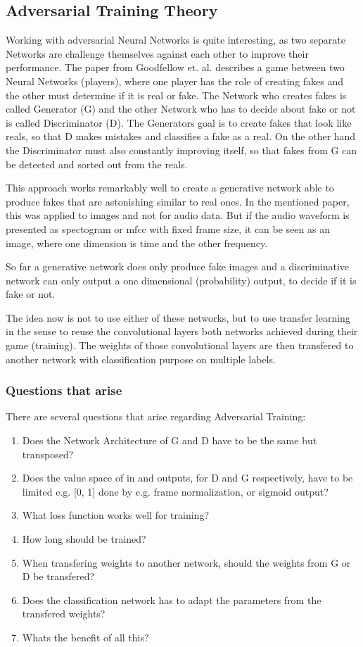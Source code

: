 \subsection{Adversarial Training Theory}\label{sec:adv_theory}
Working with adversarial Neural Networks is quite interesting, as two separate Networks are challenge themselves against each other to improve their performance.
The paper from Goodfellow et. al. \cite{goodfellow2014} describes a game between two Neural Networks (players), where one player has the role of creating fakes and the other must determine if it is real or fake.
The Network who creates fakes is called Generator (G) and the other Network who has to decide about fake or not is called Discriminator (D).
The Generators goal is to create fakes that look like reals, so that D makes mistakes and classifies a fake as a real.
On the other hand the Discriminator must also constantly improving itself, so that fakes from G can be detected and sorted out from the reals.

This approach works remarkably well to create a generative network able to produce fakes that are astonishing similar to real ones.
In the mentioned paper, this was applied to images and not for audio data.
But if the audio waveform is presented as spectogram or mfcc with fixed frame size, it can be seen as an image, where one dimension is time and the other frequency.

So far a generative network does only produce fake images and a discriminative network can only output a one dimensional (probability) output, to decide if it is fake or not.

The idea now is not to use either of these networks, but to use transfer learning in the sense to reuse the convolutional layers both networks achieved during their game (training).
The weights of those convolutional layers are then transfered to another network with classification purpose on multiple labels.

\subsubsection{Questions that arise}
There are several questions that arise regarding Adversarial Training:
\begin{enumerate}[label={Q.\textgoth{A}.\arabic*)}, leftmargin=1.4cm]
  \item Does the Network Architecture of G and D have to be the same but transposed?
  \item Does the value space of in and outputs, for D and G respectively, have to be limited e.g. [0, 1] done by e.g. frame normalization, or sigmoid output?
  \item What loss function works well for training?
  \item How long should be trained?
  \item When transfering weights to another network, should the weights from G or D be transfered?
  \item Does the classification network has to adapt the parameters from the transfered weights?
  \item Whats the benefit of all this?
\end{enumerate}

